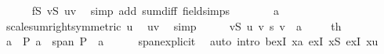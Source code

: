 \begin{isabellebody}
\ \ \ \ \isamarkupfalse%
\ fS\ vS\ uv\ \isamarkupfalse%
\ {\isacharparenleft}{\kern0pt}simp\ add{\isacharcolon}{\kern0pt}\ sum{\isacharunderscore}{\kern0pt}diff{}\ field{\isacharunderscore}{\kern0pt}simps{\isacharparenright}{\kern0pt}\isanewline
\ \ \isamarkupfalse%
\ \isamarkupfalse%
\ {\isachardoublequoteopen}{\isasymdots}\ {\isacharequal}{\kern0pt}\ {\isacharquery}{\kern0pt}a{\isachardoublequoteclose}\isanewline
\ \ \ \ \isamarkupfalse%
\ scale{\isacharunderscore}{\kern0pt}sum{\isacharunderscore}{\kern0pt}right{\isacharbrackleft}{\kern0pt}symmetric{\isacharbrackright}{\kern0pt}\ u\ \isamarkupfalse%
\ uv\ \isamarkupfalse%
\ simp\isanewline
\ \ \isamarkupfalse%
\ \isamarkupfalse%
\ {\isachardoublequoteopen}{\isacharparenleft}{\kern0pt}{\isasymSum}v{\isasymin}{\isacharquery}{\kern0pt}S{\isachardot}{\kern0pt}\ {\isacharquery}{\kern0pt}u\ v\ {\isacharasterisk}{\kern0pt}s\ v{\isacharparenright}{\kern0pt}\ {\isacharequal}{\kern0pt}\ {\isacharquery}{\kern0pt}a{\isachardoublequoteclose}\ \isacommand{{\isachardot}{\kern0pt}}\isamarkupfalse%
\isanewline
\ \ \isamarkupfalse%
\ th{}\ \isamarkupfalse%
\ {\isachardoublequoteopen}{\isasymexists}a\ {\isasymin}\ P{\isachardot}{\kern0pt}\ a\ {\isasymin}\ span\ {\isacharparenleft}{\kern0pt}P\ {\isacharminus}{\kern0pt}\ {\isacharbraceleft}{\kern0pt}a{\isacharbraceright}{\kern0pt}{\isacharparenright}{\kern0pt}{\isachardoublequoteclose}\isanewline
\ \ \ \ \isamarkupfalse%
\ span{\isacharunderscore}{\kern0pt}explicit\ \isamarkupfalse%
\ {\isacharparenleft}{\kern0pt}auto\ intro{\isacharbang}{\kern0pt}{\isacharcolon}{\kern0pt}\ bexI{\isacharbrackleft}{\kern0pt}\ x{\isacharequal}{\kern0pt}{\isachardoublequoteopen}{\isacharquery}{\kern0pt}a{\isachardoublequoteclose}{\isacharbrackright}{\kern0pt}\ exI{\isacharbrackleft}{\kern0pt}\ x{\isacharequal}{\kern0pt}{\isachardoublequoteopen}{\isacharquery}{\kern0pt}S{\isachardoublequoteclose}{\isacharbrackright}{\kern0pt}\ exI{\isacharbrackleft}{\kern0pt}\ x{\isacharequal}{\kern0pt}{\isachardoublequoteopen}{\isacharquery}{\kern0pt}u{\isachardoublequoteclose}{\isacharbrackright}{\kern0pt}{\isacharparenright}{\kern0pt}\isanewline
{}\isamarkupfalse%
%
\endisatagproof
{\isafoldproof}%
%
\isadelimproof
\isanewline
%
\endisadelimproof
\isanewline
{}\isamarkupfalse%

\end{isabellebody}
